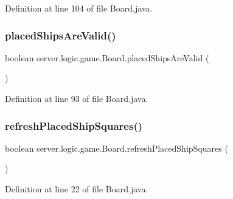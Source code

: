 Definition at line 104 of file Board.\+java.

\hypertarget{classserver_1_1logic_1_1game_1_1_board_a84f0eed1bfb61878ff62ba2ce1249048}{}\label{classserver_1_1logic_1_1game_1_1_board_a84f0eed1bfb61878ff62ba2ce1249048} 
\subsubsection{\texorpdfstring{placed\+Ships\+Are\+Valid()}{placedShipsAreValid()}}
{\footnotesize\ttfamily boolean server.\+logic.\+game.\+Board.\+placed\+Ships\+Are\+Valid (\begin{DoxyParamCaption}{ }\end{DoxyParamCaption})}



Definition at line 93 of file Board.\+java.

\hypertarget{classserver_1_1logic_1_1game_1_1_board_a5e92f382c9a8f31b78c43ed70feb9f48}{}\label{classserver_1_1logic_1_1game_1_1_board_a5e92f382c9a8f31b78c43ed70feb9f48} 
\subsubsection{\texorpdfstring{refresh\+Placed\+Ship\+Squares()}{refreshPlacedShipSquares()}}
{\footnotesize\ttfamily boolean server.\+logic.\+game.\+Board.\+refresh\+Placed\+Ship\+Squares (\begin{DoxyParamCaption}{ }\end{DoxyParamCaption})}



Definition at line 22 of file Board.\+java.

\hypertarget{classserver_1_1logic_1_1game_1_1_board_abcacddd3a6d0e781fb3c39408c6f2720}{}\label{classserver_1_1logic_1_1game_1_1_board_abcacddd3a6d0e781fb3c39408c6f2720} 
